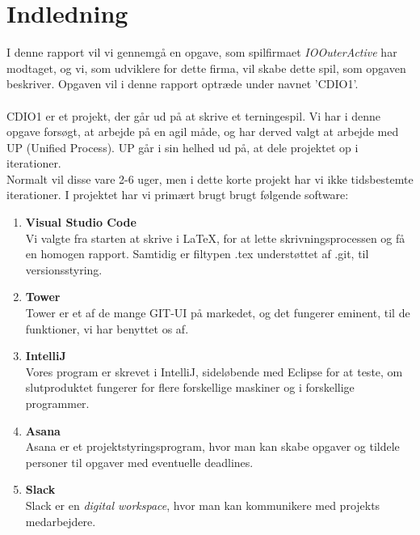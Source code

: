 \chapter{Indledning}
I denne rapport vil vi gennemgå en opgave, som spilfirmaet \textit{IOOuterActive} har modtaget, og vi, som udviklere for dette firma, vil skabe dette spil, som opgaven beskriver.
Opgaven vil i denne rapport optræde under navnet 'CDIO1'.
\\\\CDIO1 er et projekt, der går ud på at skrive et terningespil.
Vi har i denne opgave forsøgt, at arbejde på en agil måde, og har derved valgt at arbejde med UP (Unified Process). 
UP går i sin helhed ud på, at dele projektet op i iterationer. 
\\ Normalt vil disse vare 2-6 uger, men i dette korte projekt har vi ikke tidsbestemte iterationer.
I projektet har vi primært brugt brugt følgende software:
\begin{enumerate}
    \item \textbf{Visual Studio Code}
    \\ Vi valgte fra starten at skrive i LaTeX, for at lette skrivningsprocessen og få en homogen rapport.
    Samtidig er filtypen .tex understøttet af .git, til versionsstyring.
    \item \textbf{Tower}
    \\Tower er et af de mange GIT-UI på markedet, og det fungerer eminent, til de funktioner, vi har benyttet os af.
    \item \textbf{IntelliJ}
    \\Vores program er skrevet i IntelliJ, sideløbende med Eclipse for at teste, om slutproduktet fungerer for flere forskellige maskiner og i forskellige programmer.
    \item \textbf{Asana}
    \\Asana er et projektstyringsprogram, hvor man kan skabe opgaver og tildele personer til opgaver med eventuelle deadlines.
    \item \textbf{Slack}
    \\Slack er en \textit{digital workspace}, hvor man kan kommunikere med projekts medarbejdere.
\end{enumerate}

